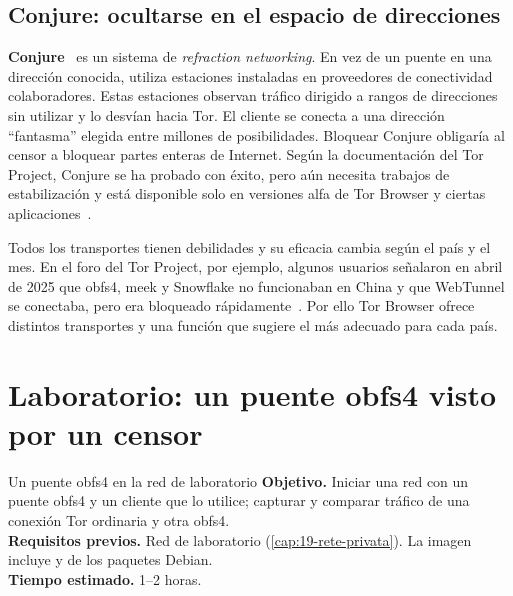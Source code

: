 \subsection{Conjure: ocultarse en el espacio de direcciones}

\textbf{Conjure}~\cite{frolov2019conjure} es un sistema de \emph{refraction networking}. En vez de un puente en una dirección conocida, utiliza estaciones instaladas en proveedores de conectividad colaboradores. Estas estaciones observan tráfico dirigido a rangos de direcciones sin utilizar y lo desvían hacia Tor. El cliente se conecta a una dirección \enquote{fantasma} elegida entre millones de posibilidades. Bloquear Conjure obligaría al censor a bloquear partes enteras de Internet. Según la documentación del Tor Project, Conjure se ha probado con éxito, pero aún necesita trabajos de estabilización y está disponible solo en versiones alfa de Tor Browser y ciertas aplicaciones~\cite{torsupport}.

\begin{attenzione}
Todos los transportes tienen debilidades y su eficacia cambia según el país y el mes. En el foro del Tor Project, por ejemplo, algunos usuarios señalaron en abril de 2025 que obfs4, meek y Snowflake no funcionaban en China y que WebTunnel se conectaba, pero era bloqueado rápidamente~\cite{forumcina2025}. Por ello Tor Browser ofrece distintos transportes y una función que sugiere el más adecuado para cada país.
\end{attenzione}

\section{Laboratorio: un puente obfs4 visto por un censor}\label{sec:lab-censura}

\begin{laboratorio}[10]{Un puente obfs4 en la red de laboratorio}
\textbf{Objetivo.} Iniciar una red con un puente obfs4 y un cliente que lo utilice; capturar y comparar tráfico de una conexión Tor ordinaria y otra obfs4.\\
\textbf{Requisitos previos.} Red de laboratorio (\cref{cap:19-rete-privata}). La imagen incluye  y  de los paquetes Debian.\\
\textbf{Tiempo estimado.} 1--2 horas.
\end{laboratorio}

